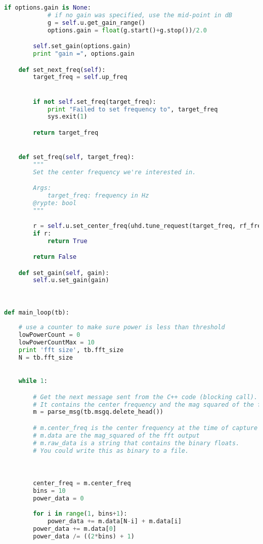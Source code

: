 \begin{lstlisting}[language=Python]
        if options.gain is None:
            # if no gain was specified, use the mid-point in dB
            g = self.u.get_gain_range()
            options.gain = float(g.start()+g.stop())/2.0

        self.set_gain(options.gain)
        print "gain =", options.gain

    def set_next_freq(self):
        target_freq = self.up_freq


        if not self.set_freq(target_freq):
            print "Failed to set frequency to", target_freq
            sys.exit(1)

        return target_freq


    def set_freq(self, target_freq):
        """
        Set the center frequency we're interested in.

        Args:
            target_freq: frequency in Hz
        @rypte: bool
        """
        
        r = self.u.set_center_freq(uhd.tune_request(target_freq, rf_freq=(target_freq + self.lo_offset),rf_freq_policy=uhd.tune_request.POLICY_MANUAL))
        if r:
            return True

        return False

    def set_gain(self, gain):
        self.u.set_gain(gain)
    


def main_loop(tb):
    
    # use a counter to make sure power is less than threshold
    lowPowerCount = 0
    lowPowerCountMax = 10
    print 'fft size', tb.fft_size
    N = tb.fft_size
    

    while 1:

        # Get the next message sent from the C++ code (blocking call).
        # It contains the center frequency and the mag squared of the fft
        m = parse_msg(tb.msgq.delete_head())

        # m.center_freq is the center frequency at the time of capture
        # m.data are the mag_squared of the fft output
        # m.raw_data is a string that contains the binary floats.
        # You could write this as binary to a file.



        center_freq = m.center_freq
        bins = 10
        power_data = 0
        
        for i in range(1, bins+1):
            power_data += m.data[N-i] + m.data[i]
        power_data += m.data[0]
        power_data /= ((2*bins) + 1)
        

\end{lstlisting}
